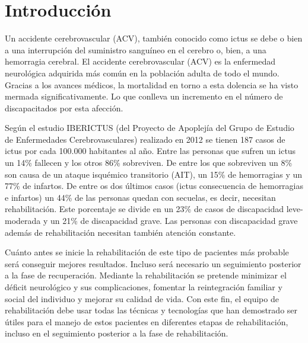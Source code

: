 \chapter{Introducción}

Un accidente cerebrovascular (ACV), también conocido como ictus se debe o bien a una interrupción del suministro sanguíneo en el cerebro o, bien, a una hemorragia cerebral.
El accidente cerebrovascular (ACV) es la enfermedad neurológica adquirida más común en la población adulta de todo el mundo. Gracias a los avances médicos, la mortalidad en torno a esta dolencia se ha visto mermada significativamente. Lo que conlleva un incremento en el número de discapacitados por esta afección. \cite{miradaRehab}

Según el estudio IBERICTUS (del Proyecto de Apoplejía del Grupo de Estudio de Enfermedades Cerebrovasculares) realizado en 2012 se tienen 187 casos de ictus por cada 100.000 habitantes al año. Entre las personas que sufren un ictus un 14\% fallecen y los otros 86\% sobreviven\cite{iberIctus}.  De entre los que sobreviven un 8\% son causa de un ataque isquémico transitorio (AIT), un 15\% de hemorragias y un 77\% de infartos. De entre os dos últimos casos (ictus consecuencia de hemorragias e infartos) un 44\% de las personas quedan con secuelas, es decir, necesitan rehabilitación. Este porcentaje se divide en un 23\% de casos de discapacidad leve-moderada y un 21\% de discapacidad grave. Las personas con discapacidad grave además de rehabilitación necesitan también atención constante.  \cite{iberIctus}

Cuánto antes se inicie la rehabilitación de este tipo de pacientes más probable será conseguir mejores resultados. Incluso será necesario un seguimiento posterior a la fase de recuperación. Mediante la rehabilitación se pretende minimizar el déficit neurológico y sus complicaciones, fomentar la reintegración familiar y social del individuo y mejorar su
calidad de vida. Con este fin, el equipo de rehabilitación debe usar todas las técnicas y tecnologías que han demostrado ser útiles para el manejo de estos pacientes en diferentes etapas de rehabilitación, incluso en el seguimiento posterior a la fase de rehabilitación. \cite{miradaRehab}


